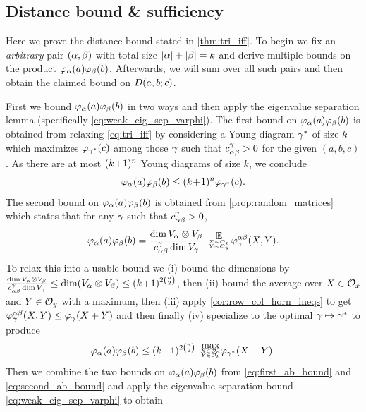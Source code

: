 \documentclass[notitlepage, 11pt, letterpaper]{amsart}
\begin{document}
\subsection{Distance bound \& sufficiency}
\label{sec:dist_bound_for_orig_horn}

Here we prove the distance bound stated in \cref{thm:tri_iff}.
To begin we fix an \textit{arbitrary} pair $(\alpha,\beta)$ with total size $|\alpha| + |\beta| = k$ and derive multiple bounds on the product $\varphi_{\alpha}(a)\varphi_{\beta}(b)$.
Afterwards, we will sum over all such pairs and then obtain the claimed bound on $D(a,b;c)$.

First we bound $\varphi_{\alpha}(a)\varphi_{\beta}(b)$ in two ways and then apply the eigenvalue separation lemma (specifically \cref{eq:weak_eig_sep_varphi}).
The first bound on $\varphi_{\alpha}(a)\varphi_{\beta}(b)$ is obtained from relaxing \cref{eq:tri_iff} by considering a Young diagram $\gamma^{*}$ of size $k$ which maximizes $\varphi_{\gamma^{*}}(c)$ among those $\gamma$ such that $c^{\gamma}_{\alpha\beta}> 0$ for the given $(a,b,c)$.
As there are at most $(k\!+\!1)^{n}$ Young diagrams of size $k$, we conclude
\begin{equation}
    \label{eq:first_ab_bound}
    \varphi_{\alpha}(a)\varphi_{\beta}(b) \leq (k\!+\!1)^{n} \varphi_{\gamma^{*}}(c).
\end{equation}
The second bound on $\varphi_{\alpha}(a)\varphi_{\beta}(b)$ is obtained from \cref{prop:random_matrices} which states that for any $\gamma$ such that $c^{\gamma}_{\alpha\beta} > 0$,
\begin{equation}
    \vp_{\ya}(\ea)\vp_{\yb}(\eb)
    = \frac{\dim V_{\ya} \ot V_{\yb}}{c^{\yc}_{\ya\yb} \dim V_{\yc}}
    \tightdoublesubstack{\expect}{X \sim \orbit_{\ex}}{Y \sim \orbit_{\ey}}\,
    \vp^{\ya\yb}_{\yc}(X,Y).
\end{equation}
To relax this into a usable bound we (i) bound the dimensions by $\frac{\dim V_{\alpha} \otimes V_{\beta}}{c^{\gamma}_{\alpha\beta} \dim V_{\gamma}} \leq \dim (V_{\alpha} \otimes V_{\beta}) \leq (k\!+\!1)^{2\binom{n}{2}}$, then (ii) bound the average over $X \in \mathcal O_{x}$ and $Y \in \mathcal O_{y}$ with a maximum, then (iii) apply \cref{cor:row_col_horn_ineqs} to get $\varphi^{\alpha\beta}_{\gamma}(X,Y) \leq \varphi_{\gamma}(X+Y)$ and then finally (iv) specialize to the optimal $\gamma \mapsto \gamma^{*}$ to produce
\begin{equation}
    \label{eq:second_ab_bound}
    \vp_{\ya}(\ea)\vp_{\yb}(\eb) \leq \polyk{2\binom{n}{2}}
    \tightdoublesubstack{\mathrm{max}}{X \in \orbit_{\ea}}{Y \in \orbit_{\eb}}
    \vp_{\yc^{*}}(X+Y).
\end{equation}
Then we combine the two bounds on $\varphi_{\alpha}(a)\varphi_{\beta}(b)$ from \cref{eq:first_ab_bound} and \cref{eq:second_ab_bound} and apply the eigenvalue separation bound \cref{eq:weak_eig_sep_varphi} to obtain
\end{document}

